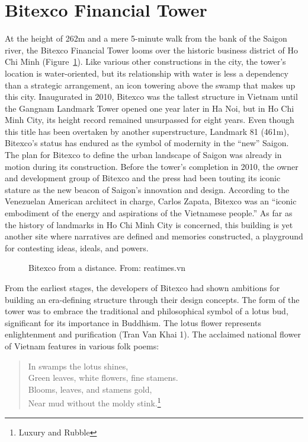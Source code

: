 \section{Bitexco Financial Tower}
At the height of 262m and a mere 5-minute walk from the bank of the Saigon river, the Bitexco Financial Tower looms over the historic business district of Ho Chi Minh (Figure~\ref{bitexco}). Like various other constructions in the city, the tower's location is water-oriented, but its relationship with water is less a dependency than a strategic arrangement, an icon towering above the swamp that makes up this city. Inaugurated in 2010, Bitexco was the tallest structure in Vietnam until the Gangnam Landmark Tower opened one year later in Ha Noi, but in Ho Chi Minh City, its height record remained unsurpassed for eight years. Even though this title has been overtaken by another superstructure, Landmark 81 (461m), Bitexco’s status has endured as the symbol of modernity in the “new” Saigon. The plan for Bitexco to define the urban landscape of Saigon was already in motion during its construction. Before the tower’s completion in 2010, the owner and development group of Bitexco and the press had been touting its iconic stature as the new beacon of Saigon’s innovation and design. According to the Venezuelan American architect in charge, Carlos Zapata, Bitexco was an “iconic embodiment of the energy and aspirations of the Vietnamese people.”  As far as the history of landmarks in Ho Chi Minh City is concerned, this building is yet another site where narratives are defined and memories constructed, a playground for contesting ideas, ideals, and powers.
\en

\begin{figure}[!ht]
\begin{center}
\vspace{-.2 in}
\caption{\vi Bitexco from a distance. From: reatimes.vn}\label{bitexco}
\end{center}
\vspace{-.2 in}
\end{figure}

\vi From the earliest stages, the developers of Bitexco had shown ambitions for building an era-defining structure through their design concepts. The form of the tower was to embrace the traditional and philosophical symbol of a lotus bud, significant for its importance in Buddhism. The lotus flower represents enlightenment and purification (Tran Van Khai 1). The acclaimed national flower of Vietnam features in various folk poems:
\begin{verse}
\begin{center}
\hspace{2em} In swamps the lotus shines, \\
Green leaves, white flowers, fine stamens.\\
\hspace{2em} Blooms, leaves, and stamens gold,\\
Near mud without the moldy stink.\footnote{Luxury and Rubble}
\end{center}
\end{verse}

